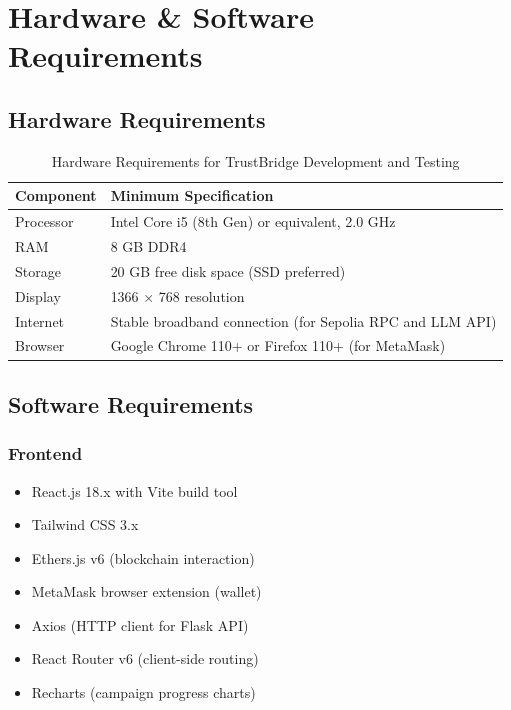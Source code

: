 \chapter{Hardware \& Software Requirements}

\section{Hardware Requirements}

\begin{table}[h!]
\centering
\renewcommand{\arraystretch}{1.5}
\begin{tabular}{|l|l|}
\hline
\textbf{Component} & \textbf{Minimum Specification} \\ \hline
Processor & Intel Core i5 (8th Gen) or equivalent, 2.0 GHz \\ \hline
RAM & 8 GB DDR4 \\ \hline
Storage & 20 GB free disk space (SSD preferred) \\ \hline
Display & 1366 × 768 resolution \\ \hline
Internet & Stable broadband connection (for Sepolia RPC and LLM API) \\ \hline
Browser & Google Chrome 110+ or Firefox 110+ (for MetaMask) \\ \hline
\end{tabular}
\caption{Hardware Requirements for TrustBridge Development and Testing}
\end{table}

\section{Software Requirements}

\subsection{Frontend}
\begin{itemize}
    \item React.js 18.x with Vite build tool
    \item Tailwind CSS 3.x
    \item Ethers.js v6 (blockchain interaction)
    \item MetaMask browser extension (wallet)
    \item Axios (HTTP client for Flask API)
    \item React Router v6 (client-side routing)
    \item Recharts (campaign progress charts)
\end{itemize}

